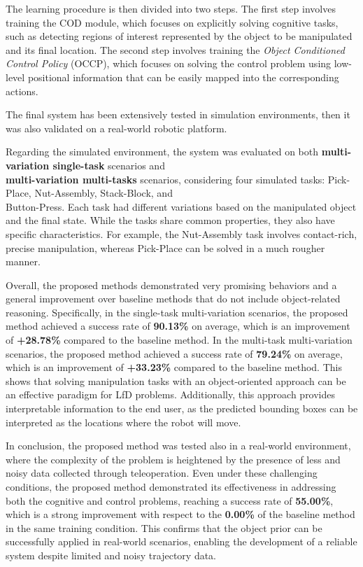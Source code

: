 The learning procedure is then divided into two steps. The first step involves training the COD module, which focuses on explicitly solving cognitive tasks, such as detecting regions of interest represented by the object to be manipulated and its final location. The second step involves training the \textit{Object Conditioned Control Policy} (OCCP), which focuses on solving the control problem using low-level positional information that can be easily mapped into the corresponding actions.

The final system has been extensively tested in simulation environments, then it was also validated on a real-world robotic platform. 

Regarding the simulated environment, the system was evaluated on both \textbf{multi-variation single-task} scenarios and \\ \textbf{multi-variation multi-tasks} scenarios, considering four simulated tasks: Pick-Place, Nut-Assembly, Stack-Block, and \\ Button-Press. Each task had different variations based on the manipulated object and the final state. While the tasks share common properties, they also have specific characteristics. For example, the Nut-Assembly task involves contact-rich, precise manipulation, whereas Pick-Place can be solved in a much rougher manner.

Overall, the proposed methods demonstrated very promising behaviors and a general improvement over baseline methods that do not include object-related reasoning. Specifically, in the single-task multi-variation scenarios, the proposed method achieved a success rate of \textbf{90.13\%} on average, which is an improvement of \textbf{+28.78\%} compared to the baseline method. In the multi-task multi-variation scenarios, the proposed method achieved a success rate of \textbf{79.24\%} on average, which is an improvement of \textbf{+33.23\%} compared to the baseline method.
This shows that solving manipulation tasks with an object-oriented approach can be an effective paradigm for LfD problems. Additionally, this approach provides interpretable information to the end user, as the predicted bounding boxes can be interpreted as the locations where the robot will move.

In conclusion, the proposed method was tested also in a real-world environment, where the complexity of the problem is heightened by the presence of less and noisy data collected through teleoperation. Even under these challenging conditions, the proposed method demonstrated its effectiveness in addressing both the cognitive and control problems, reaching a success rate of \textbf{55.00\%}, which is a strong improvement with respect to the \textbf{0.00\%} of the baseline method in the same training condition. This confirms that the object prior can be successfully applied in real-world scenarios, enabling the development of a reliable system despite limited and noisy trajectory data.
